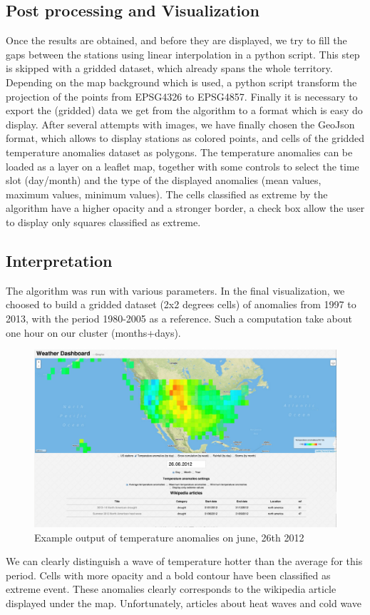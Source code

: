 \subsection{Post processing and Visualization}

Once the results are obtained, and before they are displayed, we try to fill the gaps between the stations using linear interpolation in a python script. This step is skipped with a gridded dataset, which already spans the whole territory.
Depending on the map background which is used, a python script transform the projection of the points from EPSG4326 to EPSG4857.
Finally it is necessary to export the (gridded) data we get from the algorithm to a format which is easy do display. After several attempts with images, we have finally chosen the GeoJson format, which allows to display stations as colored points, and cells of the gridded temperature anomalies dataset as polygons.
The temperature anomalies can be loaded as a layer on a leaflet map, together with some controls to select the time slot (day/month) and the type of the displayed anomalies (mean values, maximum values, minimum values).
The cells classified as extreme by the algorithm have a higher opacity and a stronger border, a check box allow the user to display only squares classified as extreme.

\subsection{Interpretation}
The algorithm was run with various parameters. In the final visualization, we choosed to build a gridded dataset (2x2 degrees cells) of anomalies from 1997 to 2013, with the period 1980-2005 as a reference. Such a computation take about one hour on our cluster (months+days).
\begin{figure}[H]
   \includegraphics[scale=0.3]{figures/temperature}
   \caption{Example output of temperature anomalies on june, 26th 2012}
\end{figure}

We can clearly distinguish a wave of temperature hotter than the average for this period. Cells with more opacity and a bold contour have been classified as extreme event.
These anomalies clearly corresponds to the wikipedia article displayed under the map. Unfortunately, articles about heat waves and cold wave

